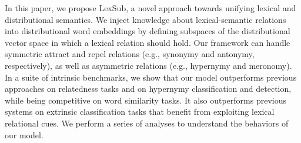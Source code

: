 In this paper, we propose LexSub, a novel approach towards unifying lexical and distributional semantics. We inject knowledge about lexical-semantic relations into distributional word embeddings by defining subspaces of the distributional vector space in which a lexical relation should hold. Our framework can handle symmetric attract and repel relations (e.g., synonymy and antonymy, respectively), as well as asymmetric relations (e.g., hypernymy and meronomy). In a suite of intrinsic benchmarks, we show that our model outperforms previous approaches on relatedness tasks and on hypernymy classification and detection, while being competitive on word similarity tasks. It also outperforms previous systems on extrinsic classification tasks that benefit from exploiting lexical relational cues. We perform a series of analyses to understand the behaviors of our model.